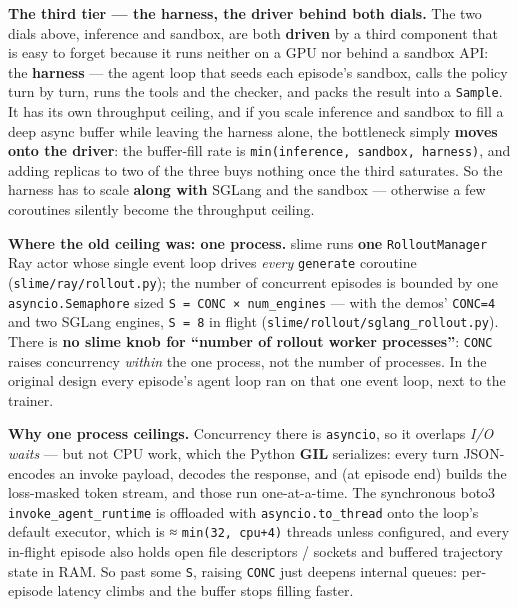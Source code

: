 \documentclass[
  paper=a4,
  ,captions=tableheading
]{scrartcl}
\begin{document}
\textbf{The third tier --- the harness, the driver behind both dials.}
The two dials above, inference and sandbox, are both \textbf{driven} by
a third component that is easy to forget because it runs neither on a
GPU nor behind a sandbox API: the \textbf{harness} --- the agent loop
that seeds each episode's sandbox, calls the policy turn by turn, runs
the tools and the checker, and packs the result into a \texttt{Sample}.
It has its own throughput ceiling, and if you scale inference and
sandbox to fill a deep async buffer while leaving the harness alone, the
bottleneck simply \textbf{moves onto the driver}: the buffer-fill rate
is \texttt{min(inference,\ sandbox,\ harness)}, and adding replicas to
two of the three buys nothing once the third saturates. So the harness
has to scale \textbf{along with} SGLang and the sandbox --- otherwise a
few coroutines silently become the throughput ceiling.

\textbf{Where the old ceiling was: one process.} slime runs \textbf{one}
\texttt{RolloutManager} Ray actor whose single event loop drives
\emph{every} \texttt{generate} coroutine
(\texttt{slime/ray/rollout.py}); the number of concurrent episodes is
bounded by one \texttt{asyncio.Semaphore} sized
\texttt{S\ =\ CONC\ ×\ num\_engines} --- with the demos' \texttt{CONC=4}
and two SGLang engines, \texttt{S\ =\ 8} in flight
(\texttt{slime/rollout/sglang\_rollout.py}). There is \textbf{no slime
knob for ``number of rollout worker processes''}: \texttt{CONC} raises
concurrency \emph{within} the one process, not the number of processes.
In the original design every episode's agent loop ran on that one event
loop, next to the trainer.

\textbf{Why one process ceilings.} Concurrency there is
\texttt{asyncio}, so it overlaps \emph{I/O waits} --- but not CPU work,
which the Python \textbf{GIL} serializes: every turn JSON-encodes an
invoke payload, decodes the response, and (at episode end) builds the
loss-masked token stream, and those run one-at-a-time. The synchronous
boto3 \texttt{invoke\_agent\_runtime} is offloaded with
\texttt{asyncio.to\_thread} onto the loop's default executor, which is ≈
\texttt{min(32,\ cpu+4)} threads unless configured, and every in-flight
episode also holds open file descriptors / sockets and buffered
trajectory state in RAM. So past some \texttt{S}, raising \texttt{CONC}
just deepens internal queues: per-episode latency climbs and the buffer
stops filling faster.
\end{document}
